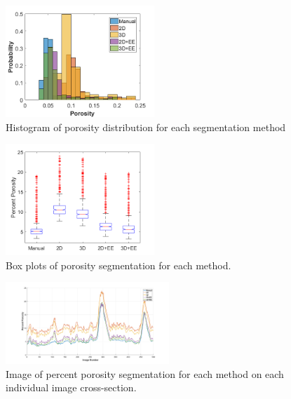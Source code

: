 \documentclass[11pt, twocolumn]{IEEEtran}
\begin{document}
\begin{figure}[h!]
	\centering
	\includegraphics[width=0.5\textwidth]{DataHistograms.png}
	\caption{Histogram of porosity distribution for each segmentation method}
	\label{fig:DataHist}
\end{figure}

\begin{figure}[h!]
	\centering
	\includegraphics[width=0.5\textwidth]{SuperBoxy.png}
	\caption{Box plots of porosity segmentation for each method.}
	\label{fig:Boxy}
\end{figure}

\begin{figure}[h!]
	\centering
	\includegraphics[width=0.55\textwidth]{Porosity.png}
	\caption{Image of percent porosity segmentation for each method on each individual image cross-section.}
	\label{fig:Outy}
\end{figure}
\end{document}
